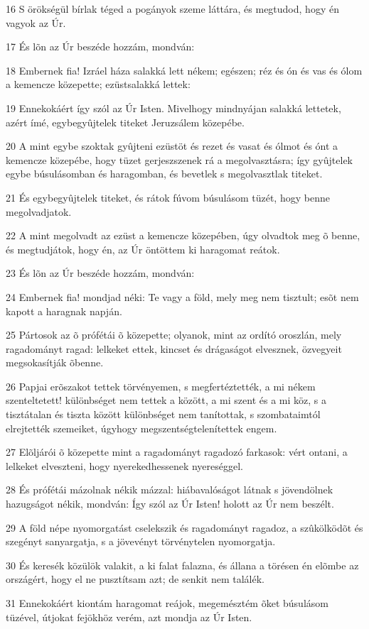 \par 16 S örökségül bírlak téged a pogányok szeme láttára, és megtudod, hogy én vagyok az Úr.
\par 17 És lõn az Úr beszéde hozzám, mondván:
\par 18 Embernek fia! Izráel háza salakká lett nékem; egészen; réz és ón és vas és ólom a kemencze közepette; ezüstsalakká lettek:
\par 19 Ennekokáért így szól az Úr Isten. Mivelhogy mindnyájan salakká lettetek, azért ímé, egybegyûjtelek titeket Jeruzsálem közepébe.
\par 20 A mint egybe szoktak gyûjteni ezüstöt és rezet és vasat és ólmot és ónt a kemencze közepébe, hogy tüzet gerjeszszenek rá a megolvasztásra; így gyûjtelek egybe búsulásomban és haragomban, és bevetlek s megolvasztlak titeket.
\par 21 És egybegyûjtelek titeket, és rátok fúvom búsulásom tüzét, hogy benne megolvadjatok.
\par 22 A mint megolvadt az ezüst a kemencze közepében, úgy olvadtok meg õ benne, és megtudjátok, hogy én, az Úr öntöttem ki haragomat reátok.
\par 23 És lõn az Úr beszéde hozzám, mondván:
\par 24 Embernek fia! mondjad néki: Te vagy a föld, mely meg nem tisztult; esõt nem kapott a haragnak napján.
\par 25 Pártosok az õ prófétái õ közepette; olyanok, mint az ordító oroszlán, mely ragadományt ragad: lelkeket ettek, kincset és drágaságot elvesznek, özvegyeit megsokasítják õbenne.
\par 26 Papjai erõszakot tettek törvényemen, s megfertéztették, a mi nékem szenteltetett! különbséget nem tettek a között, a mi szent és a mi köz,  s a tisztátalan és tiszta között különbséget nem tanítottak, s szombataimtól elrejtették szemeiket, úgyhogy megszentségtelenítettek engem.
\par 27 Elõljárói õ közepette mint a ragadományt ragadozó farkasok: vért ontani, a lelkeket elveszteni, hogy nyerekedhessenek nyereséggel.
\par 28 És prófétái mázolnak nékik mázzal: hiábavalóságot látnak s jövendölnek hazugságot nékik, mondván: Így szól az Úr Isten! holott az Úr nem beszélt.
\par 29 A föld népe nyomorgatást cselekszik és ragadományt ragadoz, a szûkölködõt és szegényt sanyargatja, s a jövevényt törvénytelen nyomorgatja.
\par 30 És keresék közülök valakit, a ki falat falazna, és állana a törésen én elõmbe az országért, hogy el ne pusztítsam azt; de senkit nem találék.
\par 31 Ennekokáért kiontám haragomat reájok, megemésztém õket búsulásom tüzével, útjokat fejökhöz verém, azt mondja az Úr Isten.

